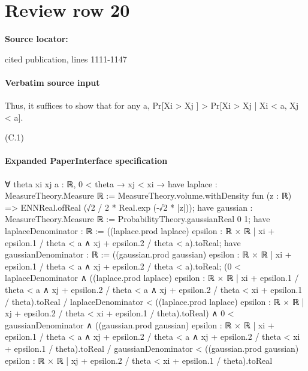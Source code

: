 \documentclass[10pt]{article}
\begin{document}
\section*{Review row 20}
\textbf{Source locator:} {\footnotesize\raggedright cited publication, lines 1111-\allowbreak{}1147\par}
\paragraph{Verbatim source input}
\begin{ReviewVerbatim}
Thus, it suffices to show that for any a,
Pr[Xi > Xj ] > Pr[Xi > Xj | Xi < a, Xj < a].

(C.1)
\end{ReviewVerbatim}



\paragraph{Expanded PaperInterface specification}
\begin{ReviewVerbatim}
∀ {theta xi xj a : ℝ},
  0 < theta →
    xj < xi →
      have laplace : MeasureTheory.Measure ℝ :=
        MeasureTheory.volume.withDensity fun (z : ℝ) => ENNReal.ofReal (√2 / 2 * Real.exp (-√2 * |z|));
      have gaussian : MeasureTheory.Measure ℝ := ProbabilityTheory.gaussianReal 0 1;
      have laplaceDenominator : ℝ :=
        ((laplace.prod laplace) {epsilon : ℝ × ℝ | xi + epsilon.1 / theta < a ∧ xj + epsilon.2 / theta < a}).toReal;
      have gaussianDenominator : ℝ :=
        ((gaussian.prod gaussian) {epsilon : ℝ × ℝ | xi + epsilon.1 / theta < a ∧ xj + epsilon.2 / theta < a}).toReal;
      (0 < laplaceDenominator ∧
          ((laplace.prod laplace)
                  {epsilon : ℝ × ℝ |
                    xi + epsilon.1 / theta < a ∧
                      xj + epsilon.2 / theta < a ∧ xj + epsilon.2 / theta < xi + epsilon.1 / theta}).toReal /
              laplaceDenominator <
            ((laplace.prod laplace) {epsilon : ℝ × ℝ | xj + epsilon.2 / theta < xi + epsilon.1 / theta}).toReal) ∧
        0 < gaussianDenominator ∧
          ((gaussian.prod gaussian)
                  {epsilon : ℝ × ℝ |
                    xi + epsilon.1 / theta < a ∧
                      xj + epsilon.2 / theta < a ∧ xj + epsilon.2 / theta < xi + epsilon.1 / theta}).toReal /
              gaussianDenominator <
            ((gaussian.prod gaussian) {epsilon : ℝ × ℝ | xj + epsilon.2 / theta < xi + epsilon.1 / theta}).toReal
\end{ReviewVerbatim}
\end{document}
